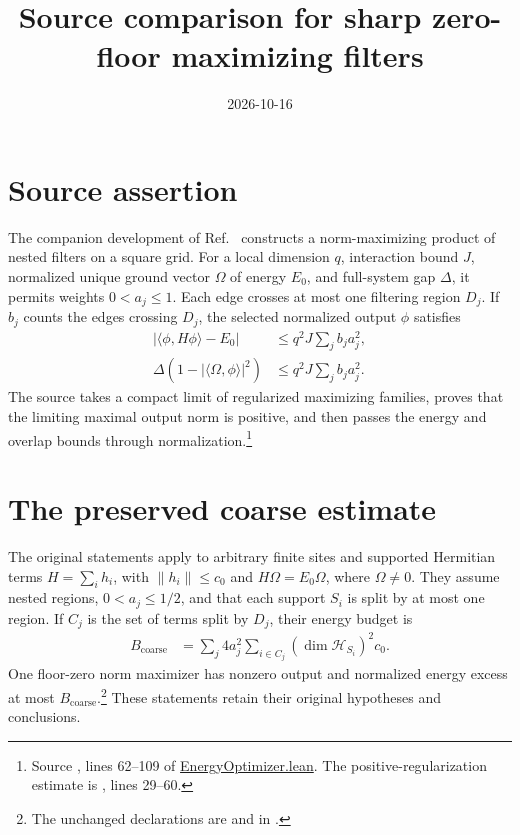 \documentclass{article}
\title{Source comparison for sharp zero-floor maximizing filters}
\author{}
\date{2026-10-16}
\begin{document}
\maketitle
{}

\section{Source assertion}

The companion development of Ref.~\cite{OpenAI2026PEPSFiltersEnergy}
constructs a norm-maximizing product of nested filters on a square grid.
For a local dimension $q$, interaction bound $J$, normalized unique ground
vector $\Omega$ of energy $E_0$, and full-system gap $\Delta$, it permits
weights $0<a_j\le1$. Each edge crosses at most one filtering region $D_j$.
If $b_j$ counts the edges crossing $D_j$, the selected normalized output
$\phi$ satisfies
\begin{align}
  |\langle\phi,H\phi\rangle-E_0|
    &\le q^2J\sum_j b_j a_j^2,
    \label{eq:zero_floor_source_energy}\\
  \Delta(1-|\langle\Omega,\phi\rangle|^2)
    &\le q^2J\sum_j b_j a_j^2.
    \label{eq:zero_floor_source_overlap}
\end{align}
The source takes a compact limit of regularized maximizing families,
proves that the limiting maximal output norm is positive, and then passes
the energy and overlap bounds through normalization.\footnote{Source
, lines 62--109 of
\href{https://github.com/openai/math/blob/adc7f1241b42e322a6451854ab7e4b4c146bf78a/lean/OAI/MathematicalPhysics/PEPSFilters/EnergyOptimizer.lean}{EnergyOptimizer.lean}.
The positive-regularization estimate is
, lines 29--60.}

\section{The preserved coarse estimate}

The original statements apply to arbitrary finite sites and supported
Hermitian terms $H=\sum_i h_i$, with $\|h_i\|\le c_0$ and
$H\Omega=E_0\Omega$, where $\Omega\ne0$. They assume nested regions,
$0<a_j\le1/2$, and that each support $S_i$ is split by at most one region.
If $C_j$ is the set of terms split by $D_j$, their energy budget is
\begin{align}
  B_{\mathrm{coarse}}
    &=\sum_j4a_j^2\sum_{i\in C_j}(\dim\mathcal H_{S_i})^2c_0.
    \label{eq:zero_floor_coarse_constant}
\end{align}
One floor-zero norm maximizer has nonzero output and normalized energy
excess at most $B_{\mathrm{coarse}}$.\footnote{The unchanged declarations are
 and
in .}
These statements retain their original hypotheses and conclusions.
\end{document}
